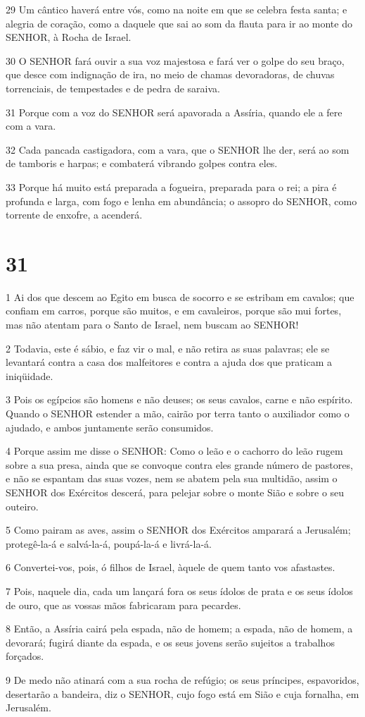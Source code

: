\par 29 Um cântico haverá entre vós, como na noite em que se celebra festa santa; e alegria de coração, como a daquele que sai ao som da flauta para ir ao monte do SENHOR, à Rocha de Israel.
\par 30 O SENHOR fará ouvir a sua voz majestosa e fará ver o golpe do seu braço, que desce com indignação de ira, no meio de chamas devoradoras, de chuvas torrenciais, de tempestades e de pedra de saraiva.
\par 31 Porque com a voz do SENHOR será apavorada a Assíria, quando ele a fere com a vara.
\par 32 Cada pancada castigadora, com a vara, que o SENHOR lhe der, será ao som de tamboris e harpas; e combaterá vibrando golpes contra eles.
\par 33 Porque há muito está preparada a fogueira, preparada para o rei; a pira é profunda e larga, com fogo e lenha em abundância; o assopro do SENHOR, como torrente de enxofre, a acenderá.

\chapter{31}

\par 1 Ai dos que descem ao Egito em busca de socorro e se estribam em cavalos; que confiam em carros, porque são muitos, e em cavaleiros, porque são mui fortes, mas não atentam para o Santo de Israel, nem buscam ao SENHOR!
\par 2 Todavia, este é sábio, e faz vir o mal, e não retira as suas palavras; ele se levantará contra a casa dos malfeitores e contra a ajuda dos que praticam a iniqüidade.
\par 3 Pois os egípcios são homens e não deuses; os seus cavalos, carne e não espírito. Quando o SENHOR estender a mão, cairão por terra tanto o auxiliador como o ajudado, e ambos juntamente serão consumidos.
\par 4 Porque assim me disse o SENHOR: Como o leão e o cachorro do leão rugem sobre a sua presa, ainda que se convoque contra eles grande número de pastores, e não se espantam das suas vozes, nem se abatem pela sua multidão, assim o SENHOR dos Exércitos descerá, para pelejar sobre o monte Sião e sobre o seu outeiro.
\par 5 Como pairam as aves, assim o SENHOR dos Exércitos amparará a Jerusalém; protegê-la-á e salvá-la-á, poupá-la-á e livrá-la-á.
\par 6 Convertei-vos, pois, ó filhos de Israel, àquele de quem tanto vos afastastes.
\par 7 Pois, naquele dia, cada um lançará fora os seus ídolos de prata e os seus ídolos de ouro, que as vossas mãos fabricaram para pecardes.
\par 8 Então, a Assíria cairá pela espada, não de homem; a espada, não de homem, a devorará; fugirá diante da espada, e os seus jovens serão sujeitos a trabalhos forçados.
\par 9 De medo não atinará com a sua rocha de refúgio; os seus príncipes, espavoridos, desertarão a bandeira, diz o SENHOR, cujo fogo está em Sião e cuja fornalha, em Jerusalém.

